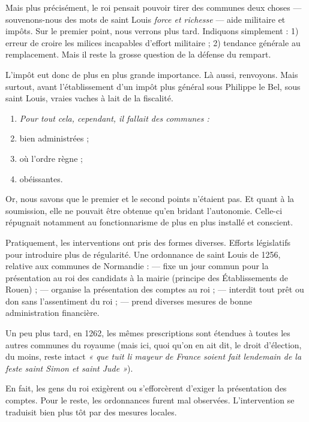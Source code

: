 \documentclass[french,twoside]{book} %
\newlength{\listmod}
\newcommand{\listhead}[1]{\hspace{-1\listmod}\emph{#1}}
\begin{document}
Mais plus précisément, le roi pensait pouvoir tirer des communes deux choses — souvenons-nous des mots de saint Louis \emph{force et richesse} — aide militaire et impôts. Sur le premier point, nous verrons plus tard. Indiquons simplement : 1) erreur de croire les milices incapables d’effort militaire ; 2) tendance générale au remplacement. Mais il reste la grosse question de la défense du rempart.\par
L’impôt eut donc de plus en plus grande importance. Là aussi, renvoyons. Mais surtout, avant l’établissement d’un impôt plus général sous Philippe le Bel, sous saint Louis, vraies vaches à lait de la fiscalité.\par

\begin{enumerate}[itemsep=0pt,]
\item[]\listhead{Pour tout cela, cependant, il fallait des communes :}
\item bien administrées ;
\item où l’ordre règne ;
\item obéissantes.

\end{enumerate}\noindent Or, nous savons que le premier et le second points n’étaient pas. Et quant à la soumission, elle ne pouvait être obtenue qu’en bridant l’autonomie. Celle-ci répugnait notamment au fonctionnarisme de plus en plus installé et conscient.\par
Pratiquement, les interventions ont pris des formes diverses. Efforts législatifs pour introduire plus de régularité. Une ordonnance de saint Louis de 1256, relative aux communes de Normandie : —  
\label{p80} fixe un jour commun pour la présentation au roi des candidats à la mairie (principe des Établissements de Rouen) ; — organise la présentation des comptes au roi ; — interdit tout prêt ou don sans l’assentiment du roi ; — prend diverses mesures de bonne administration financière.\par
Un peu plus tard, en 1262, les mêmes prescriptions sont étendues à toutes les autres communes du royaume (mais ici, quoi qu’on en ait dit, le droit d’élection, du moins, reste intact \emph{« que tuit li mayeur de France soient fait lendemain de la feste saint Simon et saint Jude »}).\par
En fait, les gens du roi exigèrent ou s’efforcèrent d’exiger la présentation des comptes. Pour le reste, les ordonnances furent mal observées. L’intervention se traduisit bien plus tôt par des mesures locales.\par
\end{document}
